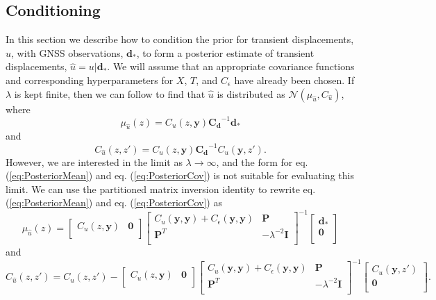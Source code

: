 \documentclass[10pt,a4paper]{article}
\begin{document}
\subsection{Conditioning}
In this section we describe how to condition the prior for transient displacements, $u$, with GNSS observations, $\bm{d}_*$, to form a posterior estimate of transient displacements, $\hat{u} = u | \bm{d}_*$. We will assume that an appropriate covariance functions and corresponding hyperparameters for $X$, $T$, and $C_\epsilon$ have already been chosen. If $\lambda$ is kept finite, then we can follow \citet{Rasmussen2006} to find that $\hat{u}$ is distributed as $\mathcal{N}(\mu_{\hat{u}},C_{\hat{u}})$, where
\begin{equation}\label{eq:PosteriorMean}
\mu_{\hat{u}}(z) = C_u(z,\bm{y})\bm{C_d}^{-1}\bm{d}_*
\end{equation}    
and
\begin{equation}\label{eq:PosteriorCov}
C_{\hat{u}}(z,z') = C_u(z,\bm{y})\bm{C_d}^{-1}C_u(\bm{y},z').
\end{equation}
However, we are interested in the limit as $\lambda \to \infty$, and the form for eq. (\ref{eq:PosteriorMean}) and eq. (\ref{eq:PosteriorCov}) is not suitable for evaluating this limit. We can use the partitioned matrix inversion identity \citep[e.g.,][]{Press2007} to rewrite eq. (\ref{eq:PosteriorMean}) and eq. (\ref{eq:PosteriorCov}) as
 \begin{equation}\label{eq:PosteriorMean2}
\mu_{\hat{u}}(z) =
\left[ 
\begin{array}{cc}
C_u(z,\bm{y}) & \bm{0} \\
\end{array}
\right]
\left[
\begin{array}{cc}
C_u(\bm{y},\bm{y}) + C_\epsilon(\bm{y},\bm{y}) & \bm{P} \\
\bm{P}^T  & -\lambda^{-2} \bm{I} \\
\end{array}
\right]^{-1}
\left[
\begin{array}{c}
\bm{d}_* \\
\bm{0} \\
\end{array}
\right]
\end{equation}    
and
\begin{equation}\label{eq:PosteriorCov2}
C_{\hat{u}}(z,z') = 
C_u(z,z') - 
\left[ 
\begin{array}{cc}
C_u(z,\bm{y}) & \bm{0} \\
\end{array}
\right]
\left[
\begin{array}{cc}
C_u(\bm{y},\bm{y}) + C_\epsilon(\bm{y},\bm{y}) & \bm{P} \\
\bm{P}^T  & -\lambda^{-2} \bm{I} \\
\end{array}
\right]^{-1}
\left[
\begin{array}{c}
C_u(\bm{y},z') \\
\bm{0} \\
\end{array}
\right].
\end{equation}
\end{document}
